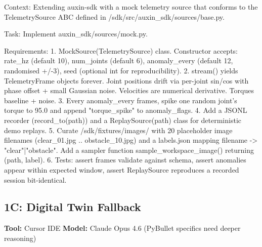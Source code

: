 \documentclass[11pt, a4paper]{article}
\begin{document}
\begin{promptbox}
Context: Extending auxin-sdk with a mock telemetry source that conforms to the TelemetrySource ABC defined in /sdk/src/auxin_sdk/sources/base.py.

Task: Implement auxin_sdk/sources/mock.py.

Requirements:
1. MockSource(TelemetrySource) class. Constructor accepts: rate_hz (default 10), num_joints (default 6), anomaly_every (default 12, randomised +/-3), seed (optional int for reproducibility).
2. stream() yields TelemetryFrame objects forever. Joint positions drift via per-joint sin/cos with phase offset + small Gaussian noise. Velocities are numerical derivative. Torques baseline + noise.
3. Every anomaly_every frames, spike one random joint's torque to 95.0 and append "torque_spike" to anomaly_flags.
4. Add a JSONL recorder (record_to(path)) and a ReplaySource(path) class for deterministic demo replays.
5. Curate /sdk/fixtures/images/ with 20 placeholder image filenames (clear_01.jpg .. obstacle_10.jpg) and a labels.json mapping filename -> "clear"|"obstacle". Add a sampler function sample_workspace_image() returning (path, label).
6. Tests: assert frames validate against schema, assert anomalies appear within expected window, assert ReplaySource reproduces a recorded session bit-identical.
\end{promptbox}

\subsection*{1C: Digital Twin Fallback}
\textbf{Tool:} Cursor IDE \quad \textbf{Model:} Claude Opus 4.6 (PyBullet specifics need deeper reasoning)
\end{document}
